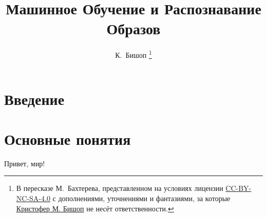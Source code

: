 \documentclass[14pt]{extarticle}
\title{Машинное Обучение и Распознавание Образов}
\author{К.~Бишоп%
  \footnote{В пересказе М.~Бахтерева,
    представленном на условиях лицензии
    \href{http://creativecommons.org/licenses/by-nc-sa/4.0/}{CC-BY-NC-SA-4.0}
    с дополнениями, уточнениями и фантазиями, за которые
    \href{https://en.wikipedia.org/wiki/Christopher_Bishop}{Кристофер М. Бишоп}
    не несёт ответственности.}}
\date{}
\begin{document}
\maketitle
\thispagestyle{fancy}

\tableofcontents

\section{Введение}

\section{Основные понятия}
Привет, мир!
\end{document}
